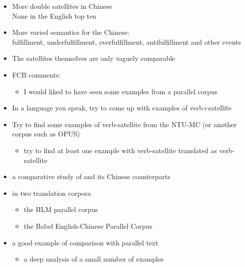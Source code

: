\documentclass[a4paper,landscape,headrule,footrule,xetex]{foils}
\begin{document}
\begin{itemize}
\item More double satellites in Chinese
\\ None in the English top ten
\item More varied semantics for the Chinese:
\\  fulfillment,  underfulfillment, overfulfillment, antifulfillment and other events
\item The satellites themselves are only vaguely comparable 
\bigskip
\item FCB comments:
  \begin{itemize}
  \item I would liked to have seen some examples from a parallel corpus
  \end{itemize}
\end{itemize}

\begin{itemize}
\item In a language you speak, try to come up with examples of verb+satellite
\item Try to find some examples of verb-satellite from the NTU-MC (or
  another corpus such as OPUS)
  \begin{itemize}
  \item try to find at least one example with verb-satellite
    translated as verb-satellite
  \end{itemize}
\end{itemize}



\begin{itemize}
\item a comparative study of  and its Chinese counterparts
\item  in two translation corpora
  \begin{itemize}
  \item the HLM parallel corpus
  \item the Babel English-Chinese Parallel Corpus
  \end{itemize}
\item a good example of comparison with parallel text
  \begin{itemize}
  \item a deep analysis of a small number of examples
  \end{itemize}
\end{itemize}
\end{document}
